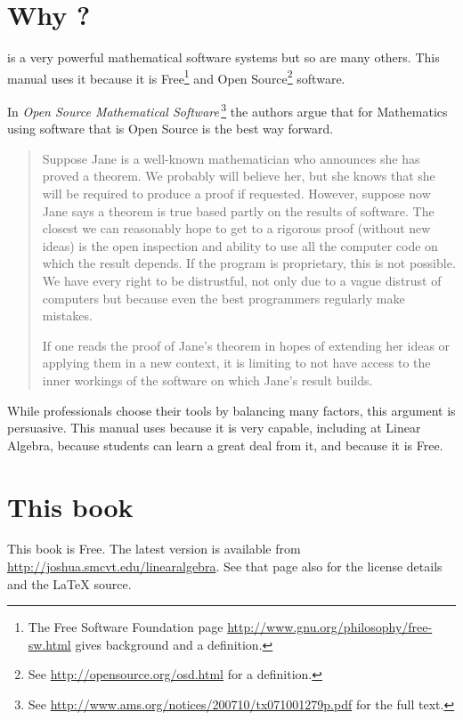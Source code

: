 \section{Why \Sage?}
\Sage{} is a very powerful mathematical software systems but so are
many others.
This manual uses it because it is 
Free\footnote{The Free Software Foundation page 
\protect\url{http://www.gnu.org/philosophy/free-sw.html} 
gives background and a definition.} 
and Open Source\footnote{See \protect\url{http://opensource.org/osd.html} 
for a definition.} 
software.

In 
\textit{Open Source Mathematical Software\,}\citep{JoynerStein07}\footnote{See 
\protect\url{http://www.ams.org/notices/200710/tx071001279p.pdf} for the 
full text.}
the authors argue that for Mathematics using software that is Open Source
is the best way forward.

\begin{quotation}\small
Suppose Jane is a well-known mathematician who announces
she has proved a theorem. We probably will believe
her, but she knows that she will be required to produce
a proof if requested. However, suppose now Jane says a
theorem is true based partly on the results of software. The
closest we can reasonably hope to get to a rigorous proof
(without new ideas) is the open inspection and ability to use
all the computer code on which the result depends. If the
program is proprietary, this is not possible. We have every
right to be distrustful, not only due to a vague distrust of
computers but because even the best programmers regularly
make mistakes.

If one reads the proof of Jane’s theorem in hopes of
extending her ideas or applying them in a new context, it
is limiting to not have access to the inner workings of the
software on which Jane’s result builds.
\end{quotation}  
While professionals choose their tools by balancing many factors,
this argument is persuasive.
This manual uses \Sage{} because it is very capable, 
including at Linear Algebra, because students can 
learn a great deal from it,
and because it is Free.


\section{This book}
This book is Free.
The latest version is available from  
\url{http://joshua.smcvt.edu/linearalgebra}.
See that page also for the license details and the \LaTeX{} source.

